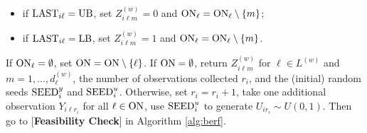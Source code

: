\documentclass[11pt]{article}
\begin{document}
\begin{algorithm}[h!]
{\begin{algorithmic}
\begin{itemize}[leftmargin=2.5cm]
                \item[] if ${\rm LAST}_{i\ell}={\rm UB}$, set $Z_{i\ell m}^{(w)}=0$ and ${\rm ON}_\ell={\rm ON}_\ell \setminus \{m\}$;
                \item[] if ${\rm LAST}_{i\ell}={\rm LB}$, set $Z_{i\ell m}^{(w)}=1$ and ${\rm ON}_\ell={\rm ON}_\ell \setminus \{m\}$.
            \end{itemize}
        \EndFor
        \State If ${\rm ON}_\ell=\emptyset$, set ${\rm ON}={\rm ON} \setminus \{\ell\}$.
    \EndFor
     If ${\rm ON}=\emptyset$, return $Z_{i\ell m}^{(w)}$ for $\ell\in L^{(w)}$ and $m=1,\ldots,d_\ell^{(w)}$, the number of observations collected $r_i$, and the (initial) random seeds ${\rm SEED}^y_i$ and ${\rm SEED}^u_i$. Otherwise, set $r_i=r_i+1$, take one additional observation $Y_{i\ell r_i}$ for all $\ell\in {\rm ON}$, use ${\rm SEED}^u_i$ to generate $U_{i r_i}\sim U(0,1)$. 
    Then go to [{\bf Feasibility Check}] in Algorithm \ref{alg:berf}.

    
	\EndFor%
	\end{algorithmic}
 }
\end{algorithm}

\vspace{-0.5cm}
\end{document}
